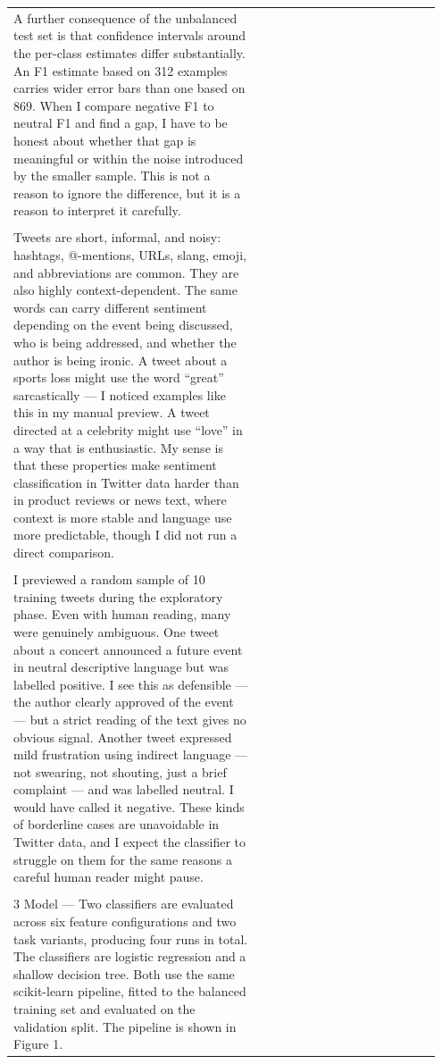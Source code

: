 \documentclass[11pt]{article}
\begin{document}
\begin{longtable}{|p{0.55\linewidth}|p{0.40\linewidth}|}
\hline
\rule{0pt}{3.5cm} & \\
\hline
A further consequence of the unbalanced test set is that confidence intervals around the per-class estimates differ substantially. An F1 estimate based on 312 examples carries wider error bars than one based on 869. When I compare negative F1 to neutral F1 and find a gap, I have to be honest about whether that gap is meaningful or within the noise introduced by the smaller sample. This is not a reason to ignore the difference, but it is a reason to interpret it carefully. & \\[2pt]
\hline
\rule{0pt}{3.5cm} & \\
\hline
Tweets are short, informal, and noisy: hashtags, @-mentions, URLs, slang, emoji, and abbreviations are common. They are also highly context-dependent. The same words can carry different sentiment depending on the event being discussed, who is being addressed, and whether the author is being ironic. A tweet about a sports loss might use the word ``great'' sarcastically --- I noticed examples like this in my manual preview. A tweet directed at a celebrity might use ``love'' in a way that is enthusiastic. My sense is that these properties make sentiment classification in Twitter data harder than in product reviews or news text, where context is more stable and language use more predictable, though I did not run a direct comparison. & \\[2pt]
\hline
\rule{0pt}{3.5cm} & \\
\hline
I previewed a random sample of 10 training tweets during the exploratory phase. Even with human reading, many were genuinely ambiguous. One tweet about a concert announced a future event in neutral descriptive language but was labelled positive. I see this as defensible --- the author clearly approved of the event --- but a strict reading of the text gives no obvious signal. Another tweet expressed mild frustration using indirect language --- not swearing, not shouting, just a brief complaint --- and was labelled neutral. I would have called it negative. These kinds of borderline cases are unavoidable in Twitter data, and I expect the classifier to struggle on them for the same reasons a careful human reader might pause. & \\[2pt]
\hline
\rule{0pt}{3.5cm} & \\
\hline
3 Model --- Two classifiers are evaluated across six feature configurations and two task variants, producing four runs in total. The classifiers are logistic regression and a shallow decision tree. Both use the same scikit-learn pipeline, fitted to the balanced training set and evaluated on the validation split. The pipeline is shown in Figure 1. & \\[2pt]

\end{longtable}
\end{document}
